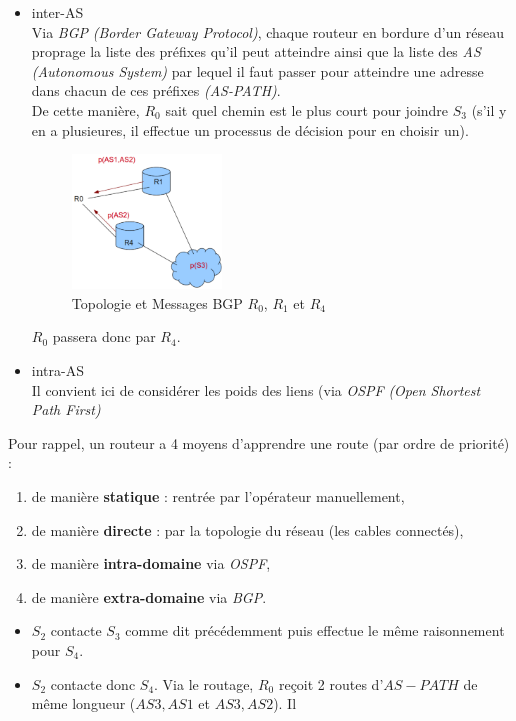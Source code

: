\documentclass{article}
\newcommand{\titre}[1]{\textcolor{title}{#1}}
\newcommand{\term}[1]{\textit{\textcolor{maintitle}{#1}}}
\begin{document}
\begin{sffamily}
\begin{enumerate}
\begin{itemize}
\item \titre{inter-AS} \\
Via \term{BGP} \textit{(Border Gateway Protocol)}, chaque routeur en bordure d'un réseau proprage la liste des préfixes qu'il 
peut atteindre ainsi que la liste des \term{AS} \textit{(Autonomous System)} par lequel il faut passer pour atteindre une 
adresse dans chacun de ces préfixes \textit{(AS-PATH)}. \\
De cette manière, $R_0$ sait quel chemin est le plus court pour joindre $S_3$ (s'il y en a plusieures, il effectue un processus 
de décision pour en choisir un).
\begin{figure}[h!]
    \begin{center}
    \includegraphics[width=150px]{img_BGP.pdf}
    \caption{Topologie et Messages BGP $R_0$, $R_1$ et $R_4$}
    \end{center}	
\end{figure}
$R_0$ passera donc par $R_4$.
\item \titre{intra-AS} \\
Il convient ici de considérer les poids des liens (via \term{OSPF} \textit{(Open Shortest Path First)}
\end{itemize}
Pour rappel, un routeur a 4 moyens d'apprendre une route (par ordre de priorité) :
\begin{enumerate}
\item de manière \textbf{statique} : rentrée par l'opérateur manuellement,
\item de manière \textbf{directe} : par la topologie du réseau (les cables connectés),
\item de manière \textbf{intra-domaine} via \term{OSPF},
\item de manière \textbf{extra-domaine} via \term{BGP}.
\end{enumerate}
\begin{itemize}
\item $S_2$ contacte $S_3$ comme dit précédemment puis effectue le même raisonnement pour $S_4$.
\item $S_2$ contacte donc $S_4$. Via le routage, $R_0$ reçoit 2 routes d'$AS-PATH$ de même longueur ($AS3,AS1$ et $AS3,AS2$). Il 

\end{itemize}
\end{enumerate}
\end{sffamily}
\end{document}
